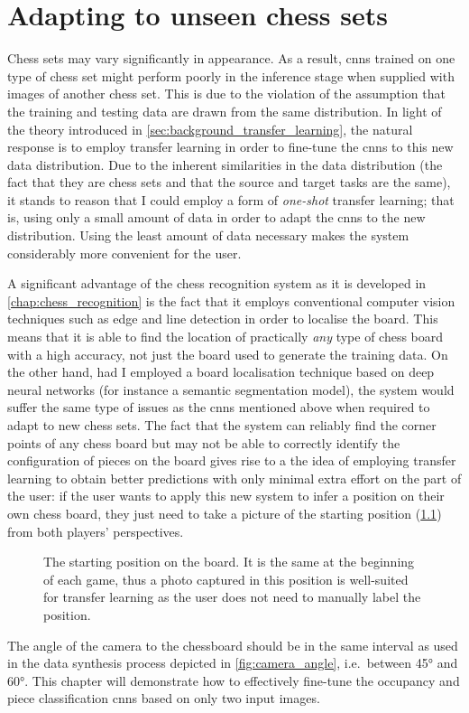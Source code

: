 \documentclass[../report.tex]{subfiles}
\begin{document}
\chapter{Adapting to unseen chess sets}
\label{chap:adapting}

Chess sets may vary significantly in appearance. 
As a result, \glspl{cnn} trained on one type of chess set might perform poorly in the inference stage when supplied with images of another chess set. 
This is due to the violation of the assumption that the training and testing data are drawn from the same distribution.
In light of the theory introduced in \cref{sec:background_transfer_learning}, the natural response is to employ transfer learning in order to fine-tune the \glspl{cnn} to this new data distribution.
Due to the inherent similarities in the data distribution (the fact that they are chess sets and that the source and target tasks are the same), it stands to reason that I could employ a form of \emph{one-shot} transfer learning; 
that is, using only a small amount of data in order to adapt the \glspl{cnn} to the new distribution.
Using the least amount of data necessary makes the system considerably more convenient for the user.

A significant advantage of the chess recognition system as it is developed in \cref{chap:chess_recognition} is the fact that it employs conventional computer vision techniques such as edge and line detection in order to localise the board.
This means that it is able to find the location of practically \emph{any} type of chess board with a high accuracy, not just the board used to generate the training data.
On the other hand, had I employed a board localisation technique based on deep neural networks (for instance a semantic segmentation model), the system would suffer the same type of issues as the \glspl{cnn} mentioned above when required to adapt to new chess sets.
The fact that the system can reliably find the corner points of any chess board but may not be able to correctly identify the configuration of pieces on the board gives rise to a the idea of employing transfer learning to obtain better predictions with only minimal extra effort on the part of the user:
if the user wants to apply this new system to infer a position on their own chess board, they just need to take a picture of the starting position (\cref{fig:chess_start_position}) from both players' perspectives.
\begin{figure}[h]
    \centering
    \newgame
    \showboard
    \caption[The starting position on the board.]{The starting position on the board. It is the same at the beginning of each game, thus a photo captured in this position is well-suited for transfer learning as the user does not need to manually label the position.}
    \label{fig:chess_start_position}
\end{figure}
The angle of the camera to the chessboard should be in the same interval as used in the data synthesis process depicted in \cref{fig:camera_angle}, i.e.\ between 45° and 60°.
This chapter will demonstrate how to effectively fine-tune the occupancy and piece classification \glspl{cnn} based on only two input images.
\end{document}
